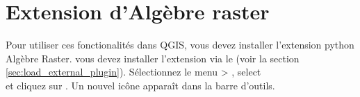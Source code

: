 \section{Extension d'Algèbre raster}\label{sec:ftools}


Pour utiliser ces fonctionalités dans QGIS, vous devez installer l'extension python Algèbre Raster. vous devez installer l'extension via le  (voir la section \ref{sec:load_external_plugin}). Sélectionnez le menu  > , select\\  et cliquez sur . Un nouvel icône  apparaît dans la barre d'outils.
